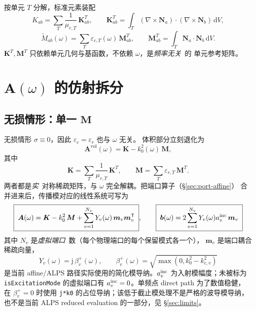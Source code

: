 \documentclass[UTF8,a4paper,11pt]{ctexart}
\newcommand{\dd}{\mathrm{d}}
\newcommand{\jj}{\mathrm{j}}
\newcommand{\transpose}{\mathsf{T}}
\newcommand{\Ne}{\bm{N}}
\newcommand{\Ke}{\bm{K}}
\newcommand{\Me}{\bm{M}}
\newcommand{\code}[1]{\texttt{\small #1}}
\begin{document}
按单元 $T$ 分解，标准元素装配
\begin{equation}
    K_{ab}=\sum_T\frac{1}{\mu_{r,T}}\,\Ke^T_{ab},\qquad
    \Ke^T_{ab}=\!\int_T(\nabla\!\times\!\Ne_a)\!\cdot\!(\nabla\!\times\!\Ne_b)\,\dd V,
    \label{eq:Ke}
\end{equation}
\begin{equation}
    \tilde M_{ab}(\omega)=\sum_T\varepsilon_{c,T}(\omega)\,\Me^T_{ab},\qquad
    \Me^T_{ab}=\!\int_T\Ne_a\!\cdot\!\Ne_b\,\dd V.
    \label{eq:Me}
\end{equation}
$\Ke^T,\Me^T$ 只依赖单元几何与基函数，不依赖 $\omega$，是\emph{频率无关}\ 的
单元参考矩阵。

\section{\texorpdfstring{$\bm A(\omega)$}{A(omega)} 的仿射拆分}
\label{sec:affine}

\subsection{\texorpdfstring{无损情形：单一 $\bm M$}{无损情形：单一 M}}

无损情形 $\sigma\equiv0$，因此 $\varepsilon_c=\varepsilon_r$ 也与 $\omega$ 无关。
体积部分立刻退化为
\begin{equation}
    \bm A^{\text{vol}}(\omega)=\bm K-k_0^{2}(\omega)\,\bm M,
    \label{eq:Avol-lossless}
\end{equation}
其中
\begin{equation}
    \bm K=\sum_T\frac{1}{\mu_{r,T}}\,\bm K^T,\qquad
    \bm M=\sum_T\varepsilon_{r,T}\,\bm M^T.
    \label{eq:K-M-global}
\end{equation}
两者都是\emph{实}\ 对称稀疏矩阵，与 $\omega$ 完全解耦。把端口算子（§\ref{sec:port-affine}）
合并进来后，传播模对应的线性系统可写为
\begin{equation}
    \boxed{\;\bm A(\omega)=\bm K-k_0^{2}\,\bm M
    +\sum_{v=1}^{N_v}Y_v(\omega)\,\bm m_v\bm m_v^{\transpose}\;},
    \qquad
    \boxed{\;\bm b(\omega)=2\sum_{v=1}^{N_v}Y_v(\omega)a_v^{\rm inc}\,\bm m_v\;}
    \label{eq:affine-lossless}
\end{equation}
其中 $N_v$ 是\emph{虚拟端口}\ 数（每个物理端口的每个保留模式各一个），
$\bm m_v$ 是端口耦合稀疏向量，
\begin{equation}
    Y_v(\omega)=\jj\,\beta_v^+(\omega),\qquad
    \beta_v^+(\omega)=\sqrt{\max(0,k_0^2-k_{c,v}^2)}
    \label{eq:modal-admittance}
\end{equation}
是当前 affine/ALPS 路径实际使用的简化模导纳。$a_v^{\rm inc}$ 为入射模幅度；未被标为
\code{isExcitationMode} 的虚拟端口有 $a_v^{\rm inc}=0$。单频点 direct path 为了数值稳健，
在 $\beta_v^+=0$ 时使用 \code{j*k0} 的占位导纳；该低于截止模处理不是严格的波导模导纳，
也不是当前 ALPS reduced evaluation 的一部分，见 §\ref{sec:limits}。
\end{document}
